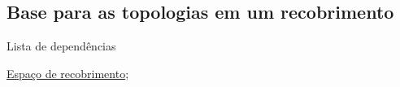 \subsection{Base para as topologias em um recobrimento} %
\label{base-para-topologias-em-recobrimento-prop}
\begin{titlemize}{Lista de dependências}
	\item \hyperref[espaco-de-recobrimento-def]{Espaço de recobrimento};\\ %
\end{titlemize}






